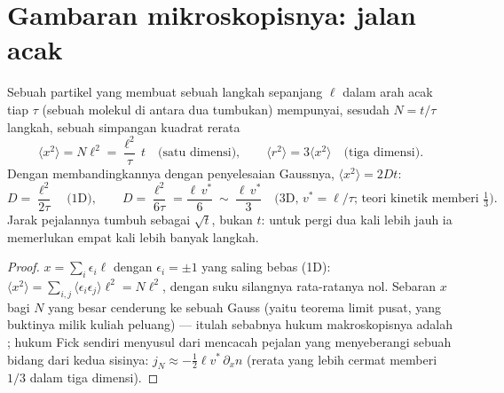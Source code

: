 \section{Gambaran mikroskopisnya: jalan acak}\label{sec:b2:particle-diffusion:microscopic}

\begin{proposition}\label{prop:b2:particle-diffusion:walk}
Sebuah partikel yang membuat sebuah langkah sepanjang $\ell$ dalam arah acak
tiap $\tau$ (sebuah molekul di antara dua tumbukan) mempunyai, sesudah $N =
t/\tau$ langkah, sebuah simpangan kuadrat rerata
\[
\langle x^2\rangle = N\ell^2 = \frac{\ell^2}{\tau}\,t
\quad\text{(satu dimensi)}, \qquad
\langle r^2\rangle = 3\langle x^2\rangle \quad\text{(tiga dimensi)}.
\]
Dengan membandingkannya dengan penyelesaian Gaussnya, $\langle x^2\rangle = 2Dt$:
\[
D = \frac{\ell^2}{2\tau} \quad\text{(1D)}, \qquad
D = \frac{\ell^2}{6\tau} = \frac{\ell\,v^*}{6}\ \sim\ \frac{\ell\,v^*}{3}
\quad\text{(3D, } v^* = \ell/\tau\text{; teori kinetik memberi } \tfrac13) .
\]
Jarak pejalannya tumbuh sebagai $\sqrt t$, bukan $t$: untuk pergi dua kali lebih jauh
ia memerlukan empat kali lebih banyak langkah.
\end{proposition}

\begin{proof}
$x = \sum_i \epsilon_i\ell$ dengan $\epsilon_i = \pm1$ yang saling bebas (1D):
$\langle x^2\rangle = \sum_{i,j}\langle\epsilon_i\epsilon_j\rangle\ell^2 =
N\ell^2$, dengan suku silangnya rata-ratanya nol. Sebaran $x$
bagi $N$ yang besar cenderung ke sebuah Gauss (yaitu teorema limit pusat, yang
buktinya milik kuliah peluang) --- itulah sebabnya
hukum makroskopisnya adalah ; hukum Fick sendiri menyusul
dari mencacah pejalan yang menyeberangi sebuah bidang dari kedua sisinya: $j_N \approx
-\tfrac12\ell v^*\,\partial_x n$ (rerata yang lebih cermat memberi $1/3$ dalam
tiga dimensi).
\end{proof}

